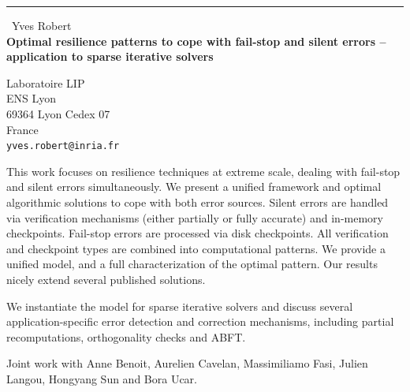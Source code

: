 \documentclass{report}
\begin{document}
\begin{center}
\rule{6in}{1pt} \
{\large Yves Robert \\
{\bf Optimal resilience patterns to cope with fail-stop and silent errors -- application to sparse iterative solvers}}

Laboratoire LIP \\ ENS Lyon \\ 69364 Lyon Cedex 07 \\ France
\\
{\tt yves.robert@inria.fr}\end{center}

This work focuses on resilience techniques at extreme scale,
dealing with fail-stop and silent errors
simultaneously. We present a unified framework and optimal algorithmic
solutions to cope with both error sources.
Silent errors are handled via verification mechanisms
(either partially or fully accurate) and in-memory checkpoints. Fail-stop
errors are processed via disk checkpoints. All verification and
checkpoint types are combined into computational patterns. We provide a
unified model, and
a full characterization of the optimal pattern. Our results nicely extend
several published solutions.

We instantiate the model for sparse iterative solvers and
discuss several application-specific error detection and correction
mechanisms, including partial recomputations, orthogonality checks and
ABFT.

Joint work with Anne Benoit, Aurelien Cavelan, Massimiliamo Fasi, Julien
Langou, Hongyang Sun and Bora Ucar.
\end{document}
